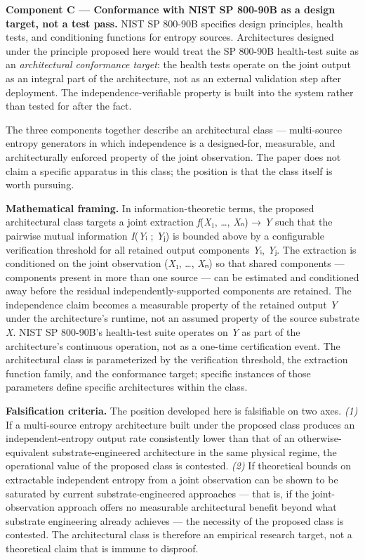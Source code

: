 \textbf{Component C --- Conformance with NIST SP 800-90B as a design
target, not a test pass.} NIST SP 800-90B specifies design principles,
health tests, and conditioning functions for entropy sources.
Architectures designed under the principle proposed here would treat the
SP 800-90B health-test suite as an \emph{architectural conformance
target}: the health tests operate on the joint output as an integral
part of the architecture, not as an external validation step after
deployment. The independence-verifiable property is built into the
system rather than tested for after the fact.

The three components together describe an architectural class ---
multi-source entropy generators in which independence is a designed-for,
measurable, and architecturally enforced property of the joint
observation. The paper does not claim a specific apparatus in this
class; the position is that the class itself is worth pursuing.

\textbf{Mathematical framing.} In information-theoretic terms, the
proposed architectural class targets a joint extraction
\emph{f}(\emph{X}₁, \ldots, \emph{X}ₙ) → \emph{Y} such that the pairwise
mutual information \emph{I}(\emph{Y}ᵢ ; \emph{Y}ⱼ) is bounded above by a
configurable verification threshold for all retained output components
\emph{Y}ᵢ, \emph{Y}ⱼ. The extraction is conditioned on the joint
observation (\emph{X}₁, \ldots, \emph{X}ₙ) so that shared components ---
components present in more than one source --- can be estimated and
conditioned away before the residual independently-supported components
are retained. The independence claim becomes a measurable property of
the retained output \emph{Y} under the architecture's runtime, not an
assumed property of the source substrate \emph{X}. NIST SP 800-90B's
health-test suite operates on \emph{Y} as part of the architecture's
continuous operation, not as a one-time certification event. The
architectural class is parameterized by the verification threshold, the
extraction function family, and the conformance target; specific
instances of those parameters define specific architectures within the
class.

\textbf{Falsification criteria.} The position developed here is
falsifiable on two axes. \emph{(1)} If a multi-source entropy
architecture built under the proposed class produces an
independent-entropy output rate consistently lower than that of an
otherwise-equivalent substrate-engineered architecture in the same
physical regime, the operational value of the proposed class is
contested. \emph{(2)} If theoretical bounds on extractable independent
entropy from a joint observation can be shown to be saturated by current
substrate-engineered approaches --- that is, if the joint-observation
approach offers no measurable architectural benefit beyond what
substrate engineering already achieves --- the necessity of the proposed
class is contested. The architectural class is therefore an empirical
research target, not a theoretical claim that is immune to disproof.

